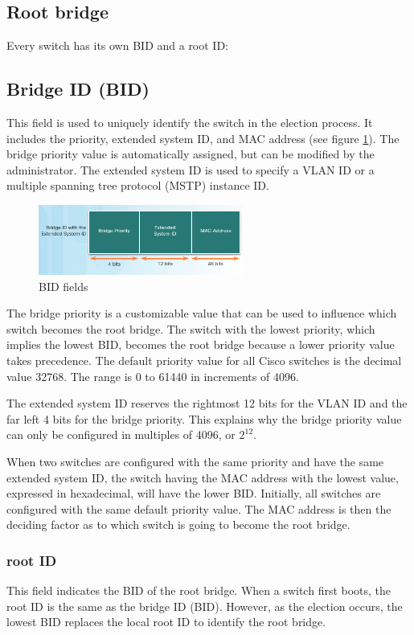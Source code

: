 \subsection{Root bridge}
Every switch has its own BID and a root ID:
\subsection{Bridge ID (BID)}
This field is used to uniquely identify the switch in the election process. It includes the priority, extended system ID, and MAC address (see figure \ref{BID}). The bridge priority value is automatically assigned, but can be modified by the administrator. The extended system ID is used to specify a VLAN ID or a multiple spanning tree protocol (MSTP) instance ID. 
\begin{figure}[hbtp]
\centering
\includegraphics[width=0.6\textwidth]{pictures/BID.png}
\caption{BID fields}
\label{BID}
\end{figure}
The bridge priority is a customizable value that can be used to influence which switch becomes the root bridge. The switch with the lowest priority, which implies the lowest BID, becomes the root bridge because a lower priority value takes precedence. The default priority value for all Cisco switches is the decimal value 32768. The range is 0 to 61440 in increments of 4096.\par 
The extended system ID reserves the rightmost 12 bits for the VLAN ID and the far left 4 bits for the bridge priority. This explains why the bridge priority value can only be configured in multiples of 4096, or $2^12$.\par 
When two switches are configured with the same priority and have the same extended system ID, the switch having the MAC address with the lowest value, expressed in hexadecimal, will have the lower BID. Initially, all switches are configured with the same default priority value. The MAC address is then the deciding factor as to which switch is going to become the root bridge. 
\subsubsection{root ID}
This field indicates the BID of the root bridge. When a switch first boots, the root ID is the same as the bridge ID (BID). However, as the election occurs, the lowest BID replaces the local root ID to identify the root bridge.
